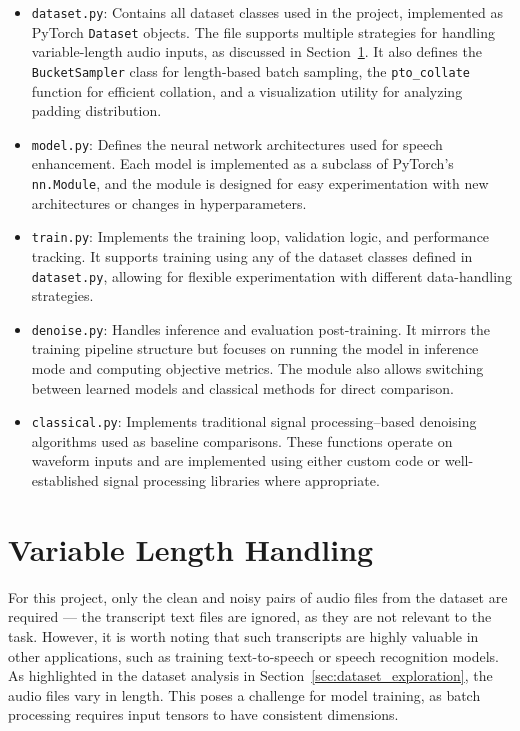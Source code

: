 \begin{itemize}
    \item \texttt{dataset.py}: Contains all dataset classes used in the project, implemented as PyTorch \texttt{Dataset} objects. The file supports multiple strategies for handling variable-length audio inputs, as discussed in Section~\ref{sec:variable_length_handling}. It also defines the \texttt{BucketSampler} class for length-based batch sampling, the \texttt{pto\_collate} function for efficient collation, and a visualization utility for analyzing padding distribution.

    \item \texttt{model.py}: Defines the neural network architectures used for speech enhancement. Each model is implemented as a subclass of PyTorch’s \texttt{nn.Module}, and the module is designed for easy experimentation with new architectures or changes in hyperparameters.

    \item \texttt{train.py}: Implements the training loop, validation logic, and performance tracking. It supports training using any of the dataset classes defined in \texttt{dataset.py}, allowing for flexible experimentation with different data-handling strategies.

    \item \texttt{denoise.py}: Handles inference and evaluation post-training. It mirrors the training pipeline structure but focuses on running the model in inference mode and computing objective metrics. The module also allows switching between learned models and classical methods for direct comparison.

    \item \texttt{classical.py}: Implements traditional signal processing–based denoising algorithms used as baseline comparisons. These functions operate on waveform inputs and are implemented using either custom code or well-established signal processing libraries where appropriate.
\end{itemize}

\section{Variable Length Handling}
\label{sec:variable_length_handling}

For this project, only the clean and noisy pairs of audio files from the dataset are required — the transcript text files are ignored, as they are not relevant to the task. However, it is worth noting that such transcripts are highly valuable in other applications, such as training text-to-speech or speech recognition models. As highlighted in the dataset analysis in Section~\ref{sec:dataset_exploration}, the audio files vary in length. This poses a challenge for model training, as batch processing requires input tensors to have consistent dimensions.

